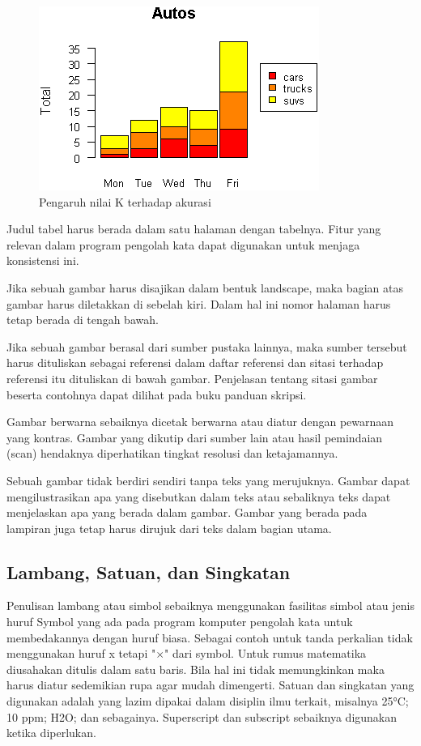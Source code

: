 \begin{figure}[ht]
  \centering
  \includegraphics[width=.5\textwidth]{babs/images/bar_script4.png}
  \caption{Pengaruh nilai K terhadap akurasi}
  \label{fig:pengaruh}
\end{figure}


Judul tabel harus berada dalam satu halaman dengan tabelnya. Fitur yang relevan dalam program pengolah kata dapat digunakan untuk menjaga konsistensi ini.

Jika sebuah gambar harus disajikan dalam bentuk landscape, maka bagian atas gambar harus diletakkan di sebelah kiri. Dalam hal ini nomor halaman harus tetap berada di tengah bawah.   

Jika sebuah gambar berasal dari sumber pustaka lainnya, maka sumber tersebut harus dituliskan sebagai referensi dalam daftar referensi dan sitasi terhadap referensi itu dituliskan di bawah gambar. Penjelasan tentang sitasi gambar beserta contohnya dapat dilihat pada buku panduan skripsi. 

Gambar berwarna sebaiknya dicetak berwarna atau diatur dengan pewarnaan yang kontras. Gambar yang dikutip dari sumber lain atau hasil pemindaian (scan) hendaknya diperhatikan tingkat resolusi dan ketajamannya.  

Sebuah gambar tidak berdiri sendiri tanpa teks yang merujuknya. Gambar dapat mengilustrasikan apa yang disebutkan dalam teks atau sebaliknya teks dapat menjelaskan apa yang berada dalam gambar. Gambar yang berada pada lampiran juga tetap harus dirujuk dari teks dalam bagian utama.

\subsection{Lambang, Satuan, dan Singkatan}

Penulisan lambang atau simbol sebaiknya menggunakan fasilitas simbol atau jenis huruf Symbol yang ada pada program komputer pengolah kata untuk membedakannya dengan huruf biasa. Sebagai contoh untuk tanda perkalian tidak menggunakan huruf x tetapi "$\times$" dari symbol. Untuk rumus matematika diusahakan ditulis dalam satu baris. Bila hal ini tidak memungkinkan maka harus diatur sedemikian rupa agar mudah dimengerti.
Satuan dan singkatan yang digunakan adalah yang lazim dipakai dalam disiplin ilmu terkait, misalnya 25°C; 10 ppm; H2O; dan sebagainya. Superscript dan subscript sebaiknya digunakan ketika diperlukan. 

